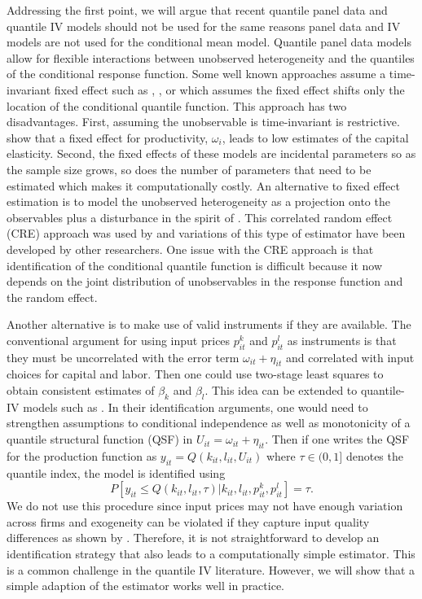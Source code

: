 \documentclass[11pt]{article}
\begin{document}
Addressing the first point, we will argue that recent quantile panel data and quantile IV models should not be used for the same reasons panel data and IV models are not used for the conditional mean model. Quantile panel data models allow for flexible interactions between unobserved heterogeneity and the quantiles of the conditional response function. Some well known approaches assume a time-invariant fixed effect such as \cite{Koenker2004}, \cite{Lamarche2010}, or \cite{Canay2011} which assumes the fixed effect shifts only the location of the conditional quantile function. This approach has two disadvantages. First, assuming the unobservable is time-invariant is restrictive. \cite{Griliches1986} show that a fixed effect for productivity, $\omega_{i}$, leads to low estimates of the capital elasticity. Second, the fixed effects of these models are incidental parameters so as the sample size grows, so does the number of parameters that need to be estimated which makes it computationally costly. An alternative to fixed effect estimation is to model the unobserved heterogeneity as a projection onto the observables plus a disturbance in the spirit of \cite{Chamberlain1984}. This correlated random effect (CRE) approach was used by \cite{Abrevaya2008} and variations of this type of estimator have been developed by other researchers. One issue with the CRE approach is that identification of the conditional quantile function is difficult because it now depends on the joint distribution of unobservables in the response function and the random effect.

Another alternative is to make use of valid instruments if they are available. The conventional argument for using input prices $p^{k}_{it}$ and $p^{l}_{it}$ as instruments is that they must be uncorrelated with the error term $\omega_{it}+\eta_{it}$ and correlated with input choices for capital and labor. Then one could use two-stage least squares to obtain consistent estimates of $\beta_{k}$ and $\beta_{l}$. This idea can be extended to quantile-IV models such as \cite{Chernozhukov2005}. In their identification arguments, one would need to strengthen assumptions to conditional independence as well as monotonicity of a quantile structural function (QSF) in $U_{it}=\omega_{it}+\eta_{it}$. Then if one writes the QSF for the production function as $y_{it}=Q(k_{it}, l_{it}, U_{it})$ where $\tau\in (0,1]$ denotes the quantile index, the model is identified using
\begin{equation}
P[y_{it}\leq Q(k_{it}, l_{it}, \tau)|k_{it}, l_{it}, p^{k}_{it}, p^{l}_{it}]=\tau.
\end{equation}
We do not use this procedure since input prices may not have enough variation across firms and exogeneity can be violated if they capture input quality differences as shown by \cite{Griliches1986}. Therefore, it is not straightforward to develop an identification strategy that also leads to a computationally simple estimator. This is a common challenge in the quantile IV literature. However, we will show that a simple adaption of the \cite{Canay2011} estimator works well in practice.
\end{document}
